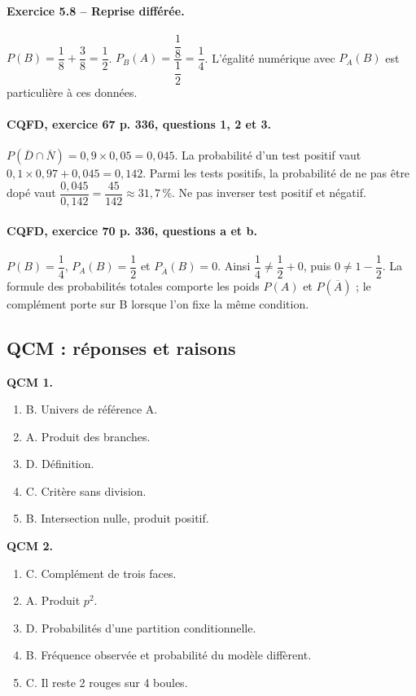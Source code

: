 \paragraph{Exercice 5.8 -- Reprise différée.} $P(B)=\dfrac{1}{8}+\dfrac{3}{8}=\dfrac{1}{2}$. $P_B(A)=\dfrac{\dfrac{1}{8}}{\dfrac{1}{2}}=\dfrac{1}{4}$. L’égalité numérique avec $P_A(B)$ est particulière à ces données.
\paragraph{CQFD, exercice 67 p. 336, questions 1, 2 et 3.} $P(\overline D\cap\overline N)=0{,}9\times0{,}05=0{,}045$. La probabilité d’un test positif vaut $0{,}1\times0{,}97+0{,}045=0{,}142$. Parmi les tests positifs, la probabilité de ne pas être dopé vaut $\dfrac{0{,}045}{0{,}142}=\dfrac{45}{142}\approx31{,}7\,\%$. Ne pas inverser test positif et négatif.
\paragraph{CQFD, exercice 70 p. 336, questions a et b.} $P(B)=\dfrac14$, $P_A(B)=\dfrac12$ et $P_{\overline A}(B)=0$. Ainsi $\dfrac14\ne\dfrac12+0$, puis $0\ne1-\dfrac12$. La formule des probabilités totales comporte les poids $P(A)$ et $P(\overline A)$ ; le complément porte sur B lorsque l’on fixe la même condition.
\subsection*{QCM : réponses et raisons}
\textbf{QCM 1.}
\begin{enumerate}
\item B. Univers de référence A.
\item A. Produit des branches.
\item D. Définition.
\item C. Critère sans division.
\item B. Intersection nulle, produit positif.
\end{enumerate}
\textbf{QCM 2.}
\begin{enumerate}
\item C. Complément de trois faces.
\item A. Produit $p^2$.
\item D. Probabilités d’une partition conditionnelle.
\item B. Fréquence observée et probabilité du modèle diffèrent.
\item C. Il reste 2 rouges sur 4 boules.
\end{enumerate}
